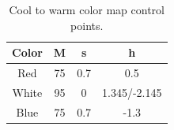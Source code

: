 \documentclass{acmsiggraph}               %
\newcommand{\RGB}{RGB\xspace}
\newcommand{\Lab}{CIELAB\xspace}
\begin{document}

\begin{table}
  \centering
  \caption{Cool to warm color map control points.}
  \begin{tabular}{c@{\qquad}ccc}
    Color & M & s & h \\
    \hline
    Red & 75 & 0.7 & 0.5 \\
    White & 95 & 0 & 1.345/-2.145 \\
    Blue & 75 & 0.7 & -1.3
  \end{tabular}
  \label{table:Cool2Warm}
\end{table}

\end{document}
